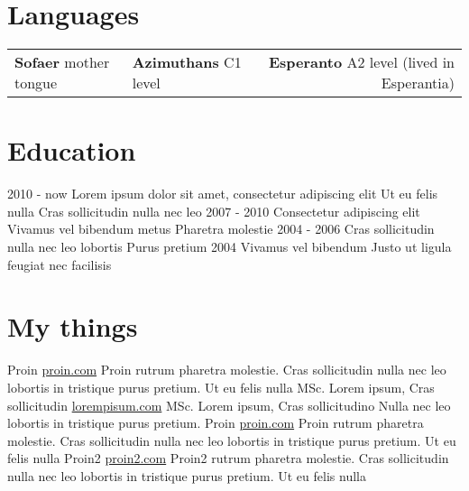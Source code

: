 \documentclass[]{viccuad-cv}
\begin{document}
\section{Languages}
    \begin{tabularx}{\linewidth}{XXr}
        \textbf{Sofaer} mother tongue & \textbf{Azimuthans} C1 level & \textbf{Esperanto} A2 level (lived in Esperantia) \tabularnewline
    \end{tabularx}
 

\section{Education}
    \begin{entrylistdated}
      \entrydated
        {2010 - now}
        {Lorem ipsum dolor sit amet, consectetur adipiscing elit}
        {Ut eu felis nulla}
        {Cras sollicitudin nulla nec leo}
      \entrydated
        {2007 - 2010}
        {Consectetur adipiscing elit}
        {Vivamus vel bibendum metus}
        {Pharetra molestie}
      \entrydated
        {2004 - 2006}
        {Cras sollicitudin nulla nec leo lobortis}
        {}
        {Purus pretium} 
      \entrydated
        {2004}
        {Vivamus vel bibendum}
        {Justo ut ligula feugiat nec facilisis}
        {}
    \end{entrylistdated}

\section{My things}
    \begin{entrylist}
      \entry
        {Proin}
        {\href{https://proin.com}{proin.com}}
        {Proin rutrum pharetra molestie. Cras sollicitudin nulla nec leo lobortis in tristique purus pretium. Ut eu felis nulla}
      \entry
        {MSc. Lorem ipsum, Cras sollicitudin}
        {\href{http://loremipsum.com}{lorempisum.com}}
        {}
      \entry
        {MSc. Lorem ipsum, Cras sollicitudino}
        {}
        {Nulla nec leo lobortis in tristique purus pretium.}
      \entry
        {Proin}
        {\href{https://proin.com}{proin.com}}
        {Proin rutrum pharetra molestie. Cras sollicitudin nulla nec leo lobortis in tristique purus pretium. Ut eu felis nulla}
      \entry
        {Proin2}
        {\href{https://proin2.com}{proin2.com}}
        {Proin2 rutrum pharetra molestie. Cras sollicitudin nulla nec leo lobortis in tristique purus pretium. Ut eu felis nulla}
    \end{entrylist}
\end{document}
